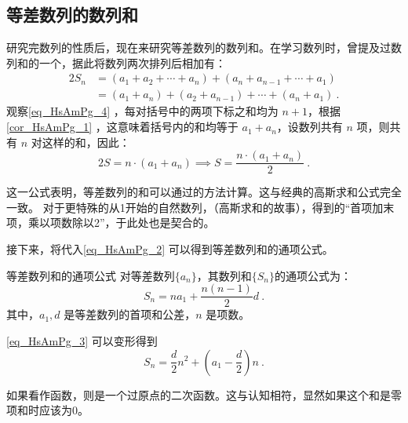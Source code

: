 \subsection{等差数列的数列和}

研究完数列的性质后，现在来研究等差数列的数列和。在学习数列时，曾提及过数列和的一个，据此将数列两次排列后相加有：
\begin{equation}\label{eq_HsAmPg_4}
\begin{split}
2S_n &= (a_1 + a_2 + \cdots + a_n)+(a_n + a_{n-1} + \cdots + a_1)\\
&=(a_1+a_{n})+(a_2+a_{n-1}) +\cdots +(a_n+a_1)~.
\end{split}
\end{equation}
观察\autoref{eq_HsAmPg_4} ，每对括号中的两项下标之和均为 $n+1$，根据\autoref{cor_HsAmPg_1} ，这意味着括号内的和均等于 $a_1 + a_n$，设数列共有 $n$ 项，则共有 $n$ 对这样的和，因此：
\begin{equation}\label{eq_HsAmPg_2}
2S = n \cdot (a_1+a_n)\implies S = \frac{n\cdot(a_1+a_n)}{2}~.
\end{equation}

这一公式表明，等差数列的和可以通过的方法计算。这与经典的高斯求和公式完全一致。
对于更特殊的从1开始的自然数列，（高斯求和的故事），得到的“首项加末项，乘以项数除以2”，于此处也是契合的。

接下来，将代入\autoref{eq_HsAmPg_2} 可以得到等差数列和的通项公式。
\begin{corollary}{等差数列和的通项公式}
对等差数列$\{a_n\}$，其数列和$\{S_n\}$的通项公式为：
\begin{equation}\label{eq_HsAmPg_3}
S_n = na_1+\frac{n(n-1)}{2}d~.
\end{equation}
其中，$a_1,d$ 是等差数列的首项和公差，$n$ 是项数。
\end{corollary}

\autoref{eq_HsAmPg_3} 可以变形得到
\begin{equation}
S_n = \frac{d}{2}n^2+\left(a_1-\frac{d}{2}\right)n~.
\end{equation}

如果看作函数，则是一个过原点的二次函数。这与认知相符，显然如果这个和是零项和时应该为$0$。


